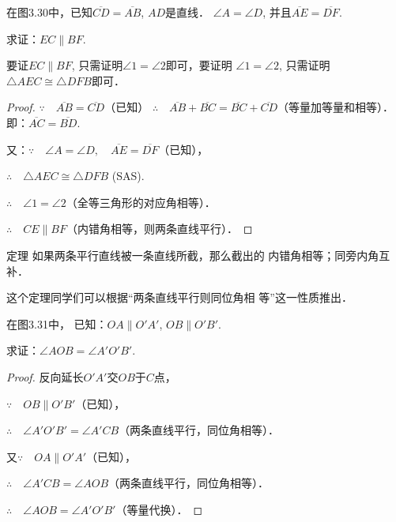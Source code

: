 \begin{example}
    在图3.30中，已知$\overline{CD}=\overline{AB}$, $AD$是直线．
$\angle A=\angle D$, 并且$\overline{AE}=\overline{DF}$.

求证：$EC\parallel BF$.

\end{example}

\begin{analyze}
要证$EC\parallel BF$, 只需证明$\angle 1=\angle 2$即可，要证明
$\angle 1=\angle 2$, 只需证明$\triangle AEC\cong \triangle DFB$即可．
\end{analyze}

\begin{proof}
    $\because\quad \overline{AB}=\overline{CD}$（已知）
    $\therefore\quad \overline{AB}+\overline{BC}=\overline{BC}+\overline{CD}$（等量加等量和相等）．即：$\overline{AC}=\overline{BD}$.

又：$\because\quad \angle A=\angle D,\quad \overline{AE}=\overline{DF}$（已知），

$\therefore\quad \triangle AEC\cong \triangle DFB$ (SAS).

$\therefore\quad \angle 1=\angle 2$（全等三角形的对应角相等）．

$\therefore\quad CE\parallel BF$（内错角相等，则两条直线平行）．
\end{proof}

\begin{blk}
  {定理} 如果两条平行直线被一条直线所截，那么截出的
内错角相等；同旁内角互补．  
\end{blk}

这个定理同学们可以根据“两条直线平行则同位角相
等”这一性质推出．

\begin{example}
     在图3.31中，
已知：$OA\parallel O'A'$, $OB\parallel O'B'$.

求证：$\angle AOB=\angle A'O'B'$.   
\end{example}

\begin{proof}
    反向延长$O'A'$交$OB$于$C$点，

$\because\quad OB\parallel O'B'$（已知），

$\therefore\quad\angle A'O'B'=\angle A'CB$（两条直线平行，同位角相等）．

又$\because\quad OA\parallel O'A'$（已知），

$\therefore\quad \angle A'CB=\angle AOB$（两条直线平行，同位角相等）．

$\therefore\quad \angle AOB=\angle A'O'B'$（等量代换）．
\end{proof}

